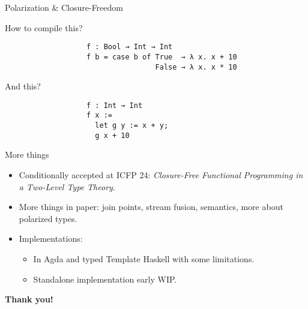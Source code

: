 \documentclass[dvipsnames,aspectratio=169]{beamer}
\theoremstyle{remark}
\begin{document}
\begin{frame}[fragile]{Polarization \& Closure-Freedom}

How to compile this?
\vspace{1em}
\begin{verbatim}
                   f : Bool → Int → Int
                   f b = case b of True  → λ x. x + 10
                                   False → λ x. x * 10
\end{verbatim}
And this?
\begin{verbatim}
                   f : Int → Int
                   f x :=
                     let g y := x + y;
                     g x + 10
\end{verbatim}
\end{frame}

\begin{frame}{More things}

\begin{itemize}
  \item Conditionally accepted at ICFP 24: \emph{Closure-Free Functional Programming in a Two-Level Type Theory}.
  \item More things in paper: join points, stream fusion, semantics, more about polarized types.
  \item Implementations:
    \begin{itemize}
      \item In Agda and typed Template Haskell with some limitations.
      \item Standalone implementation early WIP.
    \end{itemize}
\end{itemize}
\vspace{2em}

\begin{center}

  \Large{\textbf{Thank you!}}

\end{center}

\end{frame}
\end{document}
